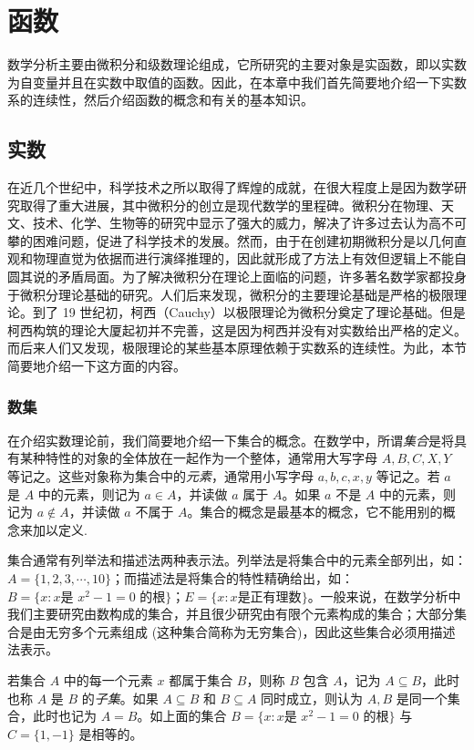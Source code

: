 \setcounter{chapter}{0} %
\chapter{函数}
数学分析主要由微积分和级数理论组成，它所研究的主要对象是实函数，即以实数为自变量并且在实数中取值的函数。因此，在本章中我们首先简要地介绍一下实数系的连续性，然后介绍函数的概念和有关的基本知识。


\section{实数}
在近几个世纪中，科学技术之所以取得了辉煌的成就，在很大程度上是因为数学研究取得了重大进展，其中微积分的创立是现代数学的里程碑。微积分在物理、天文、技术、化学、生物等的研究中显示了强大的威力，解决了许多过去认为高不可攀的困难问题，促进了科学技术的发展。然而，由于在创建初期微积分是以几何直观和物理直觉为依据而进行演绎推理的，因此就形成了方法上有效但逻辑上不能自圆其说的矛盾局面。为了解决微积分在理论上面临的问题，许多著名数学家都投身于微积分理论基础的研究。人们后来发现，微积分的主要理论基础是严格的极限理论。到了 19 世纪初，柯西（Cauchy）以极限理论为微积分奠定了理论基础。但是柯西构筑的理论大厦起初并不完善，这是因为柯西并没有对实数给出严格的定义。而后来人们又发现，极限理论的某些基本原理依赖于实数系的连续性。为此，本节简要地介绍一下这方面的内容。


\subsection{数集}
在介绍实数理论前，我们简要地介绍一下集合的概念。在数学中，所谓\emph{集合}是将具有某种特性的对象的全体放在一起作为一个整体，通常用大写字母 $A,B,C,X,Y$ 等记之。这些对象称为集合中的\emph{元素}，通常用小写字母 $a,b,c,x,y$ 等记之。若 $a$ 是 $A$ 中的元素，则记为 $a\in A$，并读做 $a$ 属于 $A$。如果 $a$ 不是 $A$ 中的元素，则记为 $a\notin A$，并读做 $a$ 不属于 $A$。集合的概念是最基本的概念，它不能用别的概念来加以定义.


集合通常有列举法和描述法两种表示法。列举法是将集合中的元素全部列出，如：$A=\{1,2,3,\cdots,10\}$；而描述法是将集合的特性精确给出，如：$B=\{x:x\text{是 }x^2-1=0\text{ 的根}\}$；$E=\{x:x\text{是正有理数}\}$。一般来说，在数学分析中我们主要研究由数构成的集合，并且很少研究由有限个元素构成的集合；大部分集合是由无穷多个元素组成 (这种集合简称为无穷集合)，因此这些集合必须用描述法表示。


若集合 $A$ 中的每一个元素 $x$ 都属于集合 $B$，则称 $B$ 包含 $A$，记为 $A\subseteq B$，此时也称 $A$ 是 $B$ 的\emph{子集}。如果 $A\subseteq B$ 和 $B\subseteq A$ 同时成立，则认为 $A,B$ 是同一个集合，此时也记为 $A=B$。如上面的集合 $B=\{x:x\text{是 }x^2-1=0\text{ 的根}\}$ 与 $C=\{1,-1\}$ 是相等的。

